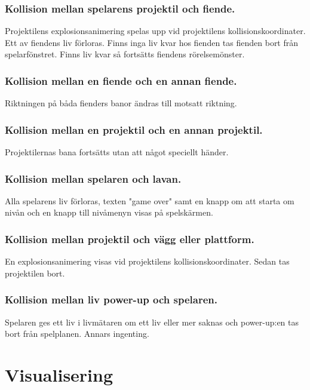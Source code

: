 \documentclass{TDP005mall}
\begin{document}
\subsubsection*{Kollision mellan spelarens projektil och fiende.\label{}}
Projektilens explosionsanimering spelas upp vid projektilens kollisionskoordinater. Ett av fiendens liv förloras. Finns inga liv kvar hos fienden tas fienden bort från spelarfönstret. Finns liv kvar så fortsätts fiendens rörelsemönster.

\subsubsection*{Kollision mellan en fiende och en annan fiende.\label{}}
Riktningen på båda fienders banor ändras till motsatt riktning.

\subsubsection*{Kollision mellan en projektil och en annan projektil.\label{}}
Projektilernas bana fortsätts utan att något speciellt händer.

\subsubsection*{Kollision mellan spelaren och lavan.\label{}}
Alla spelarens liv förloras, texten "game over" samt en knapp om att starta om nivån och en knapp till nivåmenyn visas på spelskärmen.

\subsubsection*{Kollision mellan projektil och vägg eller plattform.\label{}}
En explosionsanimering visas vid projektilens kollisionskoordinater. Sedan tas projektilen bort.

\subsubsection*{Kollision mellan liv power-up och spelaren.\label{}}
Spelaren ges ett liv i livmätaren om ett liv eller mer saknas och power-up:en tas bort från spelplanen. Annars ingenting. 

\newpage
\section{Visualisering}%
\end{document}
